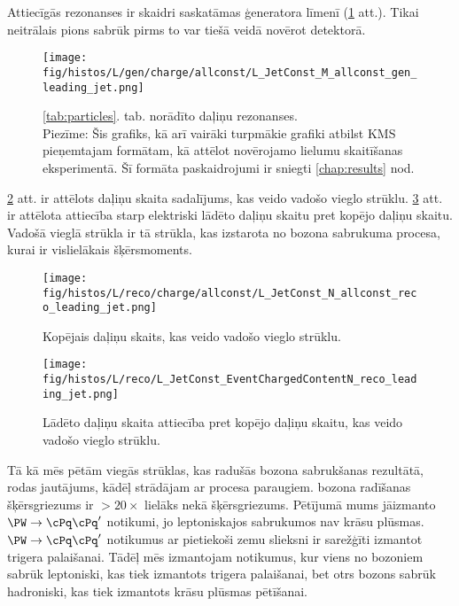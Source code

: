   Attiecīgās rezonanses ir skaidri saskatāmas ģeneratora līmenī (\ref{fig:mass_resonances} att.). Tikai neitrālais pions sabrūk pirms to var tiešā veidā novērot detektorā.

  \begin{figure}[hbtp]
    \centering
     \def\twidth{0.45}
    \texttt{[image: fig/histos/L/gen/charge/allconst/L\_JetConst\_M\_allconst\_gen\_leading\_jet.png]}
    \caption{\protect\ref{tab:particles}. tab. norādīto daļiņu rezonanses. \\
    \footnotesize Piezīme: Šis grafiks, kā arī vairāki turpmākie grafiki atbilst KMS pieņemtajam formātam, kā attēlot novērojamo lielumu skaitīšanas eksperimentā. Šī formāta paskaidrojumi ir sniegti \protect\ref{chap:results} nod.}
    \label{fig:mass_resonances}
  \end{figure}

\ref{fig:number} att. ir attēlots daļiņu skaita sadalījums, kas veido vadošo vieglo strūklu. \ref{fig:charged_content} att. ir attēlota attiecība starp elektriski lādēto daļiņu skaitu pret kopējo daļiņu skaitu. Vadošā vieglā strūkla ir tā strūkla, kas izstarota no \PW bozona sabrukuma procesa, kurai ir vislielākais šķērsmoments.

  \begin{figure}[hbtp]
    \centering
     \def\twidth{0.45}
    \texttt{[image: fig/histos/L/reco/charge/allconst/L\_JetConst\_N\_allconst\_reco\_leading\_jet.png]}
    \caption{Kopējais daļiņu skaits, kas veido vadošo vieglo strūklu.}
    \label{fig:number}

\end{figure}
     \begin{figure}[hbtp]
     \centering
     \def\twidth{0.45}
     \texttt{[image: fig/histos/L/reco/L\_JetConst\_EventChargedContentN\_reco\_leading\_jet.png]}
     \caption{Lādēto daļiņu skaita attiecība pret kopējo daļiņu skaitu, kas veido vadošo vieglo strūklu.}
  \label{fig:charged_content}
   \end{figure}

Tā kā mēs pētām viegās strūklas, kas radušās \PW bozona sabrukšanas rezultātā, rodas jautājums, kādēļ strādājam ar \ttbar procesa paraugiem. \PW bozona radīšanas šķērsgriezums ir $>20\times$ lielāks nekā \ttbar šķērsgriezums. Pētījumā mums jāizmanto $\PW\rightarrow \cPq\cPq'$ notikumi, jo leptoniskajos sabrukumos nav krāsu plūsmas. $\PW\rightarrow \cPq\cPq'$ notikumus ar pietiekoši zemu \pt slieksni ir sarežģīti izmantot trigera palaišanai. Tādēļ mēs izmantojam \ttbar notikumus, kur viens no \PW bozoniem sabrūk leptoniski, kas tiek izmantots trigera palaišanai, bet otrs \PW bozons sabrūk hadroniski, kas tiek izmantots krāsu plūsmas pētīšanai.

